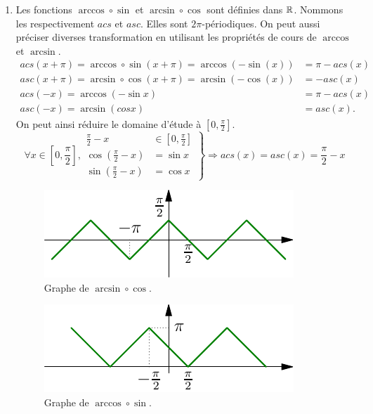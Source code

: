 \begin{enumerate}
\item Les fonctions $\arccos \circ \sin$ et $\arcsin \circ \cos$ sont définies dans $\mathbb{R}$. Nommons les respectivement $acs$ et $asc$.  Elles sont  $2\pi$-périodiques. On peut aussi préciser diverses transformation en utilisant les propriétés de cours de $\arccos$ et $\arcsin$.
\begin{align*}
 acs(x+\pi) = \arccos \circ \sin (x+\pi) = \arccos(-\sin(x)) &= \pi - acs(x)\\
 asc(x+\pi) = \arcsin \circ \cos (x+\pi) = \arcsin(-\cos(x)) &= - asc(x) \\
 acs(-x) = \arccos(-\sin x) &= \pi -acs(x) \\
 asc(-x) = \arcsin(cos x) &= asc(x). 
\end{align*}
On peut ainsi réduire le domaine d'étude à $\left[ 0 , \frac{\pi}{2}\right] $. 
\begin{displaymath}
 \forall x \in \left[ 0 , \frac{\pi}{2}\right],  
 \left. 
 \begin{aligned}
\frac{\pi}{2} -x &\in  \left[ 0 , \frac{\pi}{2}\right] \\
\cos\left( \frac{\pi}{2} -x\right) &= \sin x \\ 
\sin\left( \frac{\pi}{2} -x\right) &= \cos x 
 \end{aligned}
\right\rbrace \Rightarrow
 acs(x) = asc(x) = \frac{\pi}{2} -x
\end{displaymath}
\begin{figure}[h]
 \centering
 \includegraphics{./Celem4_1.pdf}
 \caption{Graphe de $\arcsin \circ \cos$.}
 \label{fig:Celem4_1}
\end{figure}
\begin{figure}[h]
 \centering
 \includegraphics{./Celem4_2.pdf}
 \caption{Graphe de $\arccos \circ \sin$.}

\end{figure}
\end{enumerate}
